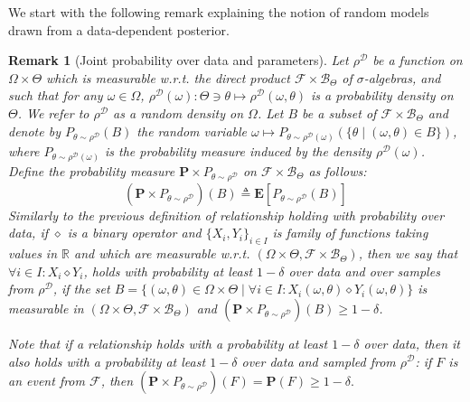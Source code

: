 \documentclass{article}
\newcommand{\train}{\mathcal{D}}
\newtheorem{remark}[theorem]{Remark}
\newcommand{\bP}{\mathbf{P}}
\newcommand{\bE}{\mathbf{E}}
\newcommand{\F}{\mathcal{F}}
\newcommand{\B}{\mathcal{B}_\Theta}
\begin{document}
We start with the following remark explaining the notion of random models drawn
from a data-dependent posterior. 
\begin{remark}[Joint probability over data and parameters]
  \label{rem:jointProb}
Let $\rho^{\train}$ be a function on $\Omega \times \Theta$
which is measurable w.r.t. the direct product $\F \times \B$ of $\sigma$-algebras, and such that
for any $\omega \in \Omega$,
$\rho^{\train}(\omega): \Theta \ni \theta \mapsto \rho^{\train}(\omega,\theta)$ is a 
probability density on $\Theta$.
We refer to $\rho^{\train}$ as a \emph{random density
on $\Omega$}. Let $B$ be a subset of $\F \times \B$ and denote by
$P_{\theta \sim \rho^{\train}}(B)$ the random variable
$\omega \mapsto P_{\theta \sim \rho^{\train}(\omega)} (\{ \theta \mid (\omega, \theta) \in B\})$, where 
$P_{\theta \sim \rho^{\train}(\omega)}$ is the probability measure induced by the density $\rho^{\train}(\omega)$.
Define the probability measure
$\bP \times P_{\theta \sim \rho^{\train}}$
on $\F \times \B$ as follows:
\[
   \left(\bP \times P_{\theta \sim \rho^{\train}}\right)(B) \triangleq
   \bE[P_{\theta \sim \rho^{\train}}(B)]
\]
Similarly to the previous definition of relationship holding with probability over data, if $\diamond$ is a binary operator and 
$\{X_i,Y_i\}_{i \in I}$ is family of functions taking values in $\mathbb{R}$ and which are measurable w.r.t. $(\Omega \times \Theta,\F \times \B)$, 
then we say that $\forall i \in I: X_i \diamond  Y_i$, holds with probability  at least $1-\delta$ over data and over samples
from $\rho^{\train}$, if the set
$B=\{ (\omega,\theta) \in \Omega \times \Theta \mid \forall i \in I: X_i(\omega,\theta) \diamond  Y_i(\omega,\theta)\}$ is
measurable in $(\Omega \times \Theta,\F \times \B)$ and
$\left(\bP \times P_{\theta \sim \rho^{\train}}\right)(B) \geq 1-\delta$. 

Note that if a relationship holds with a probability at least $1-\delta$ over data, then it also holds with a probability at least $1-\delta$ over data and sampled from $\rho^{\train}$: if $F$ is an event from $\mathcal{F}$, then 
$
\left(\bP \times P_{\theta \sim \rho^{\train}}\right)(F) = \bP(F) \geq 1-\delta.
$

\end{remark}
\end{document}
